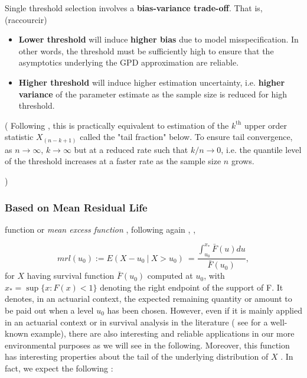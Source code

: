 \documentclass[11pt,a4paper,openany ]{book}
\begin{document}
Single threshold selection involves a \textbf{bias-variance trade-off}. That is, (raccourcir)

\begin{itemize}
	\item \textbf{Lower threshold} will induce\textbf{ higher bias} due to model misspecification. In other words, the threshold must be sufficiently high to ensure that the asymptotics underlying the GPD approximation are reliable.
	
	\item \textbf{Higher threshold} will induce higher estimation uncertainty, i.e. \textbf{higher variance} of the parameter estimate as the sample size is reduced for high threshold. 
	
\end{itemize}
(
Following \cite{leadbetter_extremes_1983}, this is practically equivalent to estimation of the $k^{\text{th}}$ upper order statistic $X_{(n-k+1)}$
called the "tail fraction" below. To ensure tail convergence, as $n\to\infty$, $k\to\infty$ but at a reduced rate such that $k/n\to 0$, i.e. the quantile level of the threshold increases at a faster rate as the sample size $n$ grows. 

)

\subsubsection*{Based on Mean Residual Life} function or \emph{mean excess function} 
, following again \cite[pp.14-19]{beirlant_statistics_2006}, \cite[pp.78-80]{coles_introduction_2001},

\begin{equation}
mrl(u_0)
:=E(X-u_0\ |\ X>u_0) 
\ = \frac{\int_{u_0}^{x_*} \bar{F}(u)du}{\bar{F}(u_0)},
\end{equation}
for $X$ having survival function $\bar{F}(u_0)$ computed at $u_0$, with $x_*=\sup\{ x:F(x)<1\}$ denoting the right endpoint of the support of F. 
It denotes, in an actuarial context, the expected remaining quantity or amount to be paid out when a level $u_0$ has been chosen. However, even if it is mainly applied in an actuarial context or in survival analysis in the literature ( see \cite{guess_mean_1988} for a well-known example), there are also interesting and reliable applications in our more environmental purposes as we will see in the following.
Moreover, this function has interesting properties about the tail of the underlying distribution of $X$ \cite[pp.16]{beirlant_statistics_2006}. In fact, we expect the following :
\end{document}
